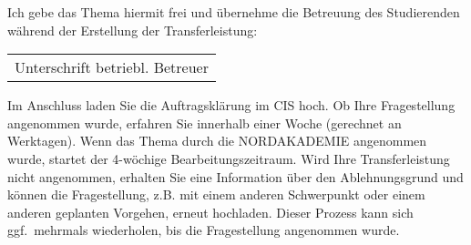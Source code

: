 \documentclass[12pt]{article}
\begin{document}
\vspace{1.5em}


\vspace{1.5em}


\vspace{1.5em}


\newpage

\vspace*{1.5em}

Ich gebe das Thema hiermit frei und übernehme die Betreuung des Studierenden während der Erstellung der Transferleistung:

\vspace{3em}

\renewcommand{\arraystretch}{1.5} %

\begin{tabularx}{.4\textwidth}{X}
    \\
    \hline
    Unterschrift betriebl. Betreuer \\
\end{tabularx}

\vspace{3em}

Im Anschluss laden Sie die
Auftragsklärung im CIS hoch. Ob Ihre Fragestellung angenommen wurde, erfahren Sie innerhalb einer Woche (gerechnet an Werktagen). Wenn das Thema durch die NORDAKADEMIE angenommen wurde, startet der 4-wöchige Bearbeitungszeitraum. Wird Ihre Transferleistung nicht angenommen, erhalten Sie eine Information über den Ablehnungsgrund und können die Fragestellung, z.B. mit einem anderen Schwerpunkt oder einem anderen geplanten Vorgehen, erneut hochladen. Dieser Prozess kann sich ggf.\ mehrmals wiederholen, bis die Fragestellung angenommen wurde.
\end{document}
